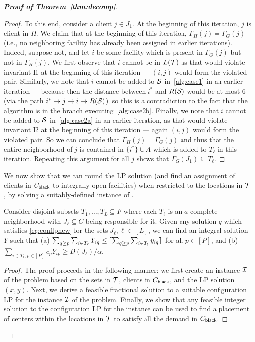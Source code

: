 \begin{proof}[{\bf Proof of Theorem~\ref{thm:decomp}}]
\begin{proof}
To this end, consider a client $j \in J_1$. At the beginning of this iteration, $j$ is client  in $H$.
We claim that at the beginning of this iteration, $\Gamma_H(j) = \Gamma_G(j)$ (i.e., no neighboring facility has already been assigned in earlier iterations). Indeed, suppose not, and let $i$ be some facility which is present in $\Gamma_G(j)$ but not in $\Gamma_H(j)$. We first observe that $i$ cannot be in $L({\cal T})$ as that would violate invariant I1 at the beginning of this iteration --- $(i,j)$ would form the violated pair. Similarly, we note that $i$ cannot be added to ${\cal S}$ in~\cref{alg:case1} in an earlier iteration --- because then the distance between $i^*$ and $R({\cal S})$ would be at most $6$ (via the path $i^* \rightarrow j \rightarrow i \rightarrow R({\cal S})$), so this is a contradiction to the fact that the algorithm is in the branch executing~\cref{alg:case2b}. Finally, we note that $i$ cannot be added to ${\cal S}$ in~\cref{alg:case2a} in an earlier iteration, as that would violate invariant I2 at the beginning of this iteration --- again $(i,j)$ would form the violated pair.
So we can conclude that $\Gamma_H(j) = \Gamma_G(j)$ and thus that the entire neighborhood of $j$ is contained in $\{i^*\} \cup A$ which is added to $T_\ell$ in this iteration. Repeating this argument for all $j$ shows that $\Gamma_G(J_1) \subseteq T_\ell$.
\end{proof}

We now show that we can round the LP solution (and find an assignment of clients in $C_{\mathsf{black}}$ to integrally open facilities) when restricted to the locations in  ${\cal T}$, by solving a suitably-defined instance of \cckp.
\begin{lemma}\label{lem:rounding-local-neighborhoods}
	Consider disjoint subsets $T_1,\ldots,T_L \subseteq F$ where each $T_\ell$ is an $a$-complete neighborhood with $J_\ell\subseteq C$ being responsible for it.
	Given any solution $y$ which satisfies \eqref{eq:conflpnew} for the sets $J_\ell, \ell \in [L]$, we can find an integral solution $Y$ such that
	 (a) $\sum_{q\geq p} \sum_{i\in T_\ell} Y_{iq} \leq \lceil\sum_{q\geq p} \sum_{i\in T_\ell} y_{iq}\rceil$ for all $p\in [P]$, and
	 (b) $\sum_{i\in T_\ell,p\in [P]} c_p Y_{ip} \geq D(J_\ell)/\alpha$.
\end{lemma}
\begin{proof}
The proof proceeds in the following manner: we first create an instance ${\cal I}$ of the \cckp problem based on the sets in ${\cal T}$, clients in $C_{\mathsf{black}}$, and the LP solution $(x,y)$. Next, we derive a feasible fractional solution to a suitable configuration LP for the instance ${\cal I}$ of the \cckp problem. Finally, we show that any feasible integer solution to the configuration LP for the \cckp instance can be used to find a placement of centers within the
locations in ${\cal T}$ to satisfy all the demand in $C_{\mathsf{black}}$.


\end{proof}
\end{proof}
